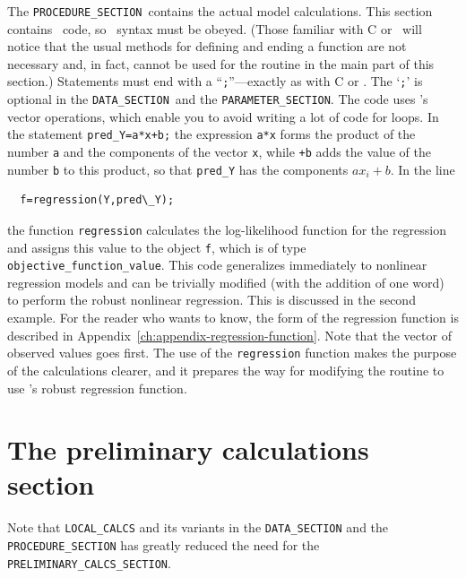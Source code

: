 \documentclass{admbmanual}
\newcommand\DS{\texttt{DATA\_SECTION}}
\newcommand\PS{\texttt{PARAMETER\_SECTION}}
\newcommand\PROS{\texttt{PROCEDURE\_SECTION}}
\begin{document}
The \PROS\ contains the actual model calculations.
This section contains \cplus\ code, so \cplus\ syntax must be obeyed.
(Those familiar with C or \cplus\ will notice that the usual
methods for defining and ending a function are not necessary 
and, in fact, cannot be used for the routine in the main part of this
section.) 
Statements must end with a ``\texttt{;}''---exactly as with C or \cplus.  
The `\texttt{;}' is
optional in the \DS\ and the \PS.
The code uses \scAD's vector operations, which enable you to avoid
writing a lot of code for loops.
In the statement \texttt{pred\_Y=a*x+b;} the expression \texttt{a*x}
forms the product of the number \texttt{a} and the components of the
vector \texttt{x}, while \texttt{+b} adds the value of the number \texttt{b}
to this product, so that \texttt{pred\_Y} has the components 
$ax_i+b$.
In the line
\begin{lstlisting}
  f=regression(Y,pred\_Y);
\end{lstlisting}
 the function 
\texttt{regression} calculates the log-likelihood function for
the regression and assigns this value to the object \texttt{f},
which is of type \texttt{objective\_function\_value}. 
This code generalizes immediately to
nonlinear regression models and can be trivially
modified (with the addition of one word) to perform the robust nonlinear
regression.  This is discussed in the second example. For the reader who wants to know,
the form of the regression function is described in Appendix~\ref{ch:appendix-regression-function}.
Note that the vector of observed values goes first. 
The use of the \texttt{regression} function makes the purpose of the
calculations clearer, and it prepares the way for
modifying the routine to use \ADM's robust regression
function.


\section{The preliminary calculations section}

Note that \texttt{LOCAL\_CALCS} and its variants in the
\texttt{DATA\_SECTION} and the \texttt{PROCEDURE\_SECTION}  has
greatly reduced the need for the \texttt{PRELIMINARY\_CALCS\_SECTION}.
\end{document}
